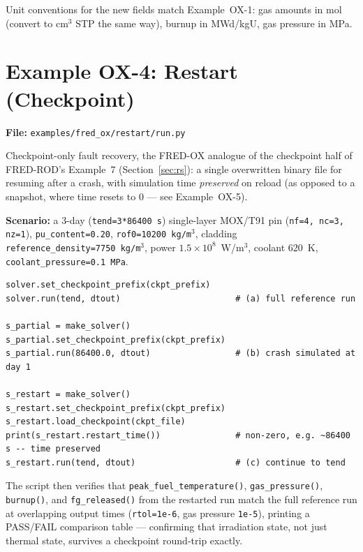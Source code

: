 \documentclass[11pt,a4paper]{article}
\begin{document}
Unit conventions for the new fields match Example~OX-1: gas amounts in mol
(convert to cm$^3$ STP the same way), burnup in MWd/kgU, gas pressure in MPa.

\section{Example OX-4: Restart (Checkpoint)}
\label{sec:ox-restart}

\textbf{File:} \texttt{examples/fred\_ox/restart/run.py}

\medskip
Checkpoint-only fault recovery, the FRED-OX analogue of the checkpoint half
of FRED-ROD's Example~7 (Section~\ref{sec:rs}): a single overwritten binary
file for resuming after a crash, with simulation time \emph{preserved} on
reload (as opposed to a snapshot, where time resets to 0 --- see
Example~OX-5).

\textbf{Scenario:} a 3-day (\texttt{tend=3*86400~s}) single-layer MOX/T91
pin (\texttt{nf=4, nc=3, nz=1}), \texttt{pu\_content=0.20},
\texttt{rof0=10200~kg/m$^3$}, cladding \texttt{reference\_density=7750~kg/m$^3$},
power $1.5\times10^8$~W/m$^3$, coolant 620~K, \texttt{coolant\_pressure=0.1~MPa}.

\begin{lstlisting}
solver.set_checkpoint_prefix(ckpt_prefix)
solver.run(tend, dtout)                       # (a) full reference run

s_partial = make_solver()
s_partial.set_checkpoint_prefix(ckpt_prefix)
s_partial.run(86400.0, dtout)                 # (b) crash simulated at day 1

s_restart = make_solver()
s_restart.set_checkpoint_prefix(ckpt_prefix)
s_restart.load_checkpoint(ckpt_file)
print(s_restart.restart_time())               # non-zero, e.g. ~86400 s -- time preserved
s_restart.run(tend, dtout)                    # (c) continue to tend
\end{lstlisting}

The script then verifies that \texttt{peak\_fuel\_temperature()},
\texttt{gas\_pressure()}, \texttt{burnup()}, and \texttt{fg\_released()} from
the restarted run match the full reference run at overlapping output times
(\texttt{rtol=1e-6}, gas pressure \texttt{1e-5}), printing a PASS/FAIL
comparison table --- confirming that irradiation state, not just thermal
state, survives a checkpoint round-trip exactly.
\end{document}
